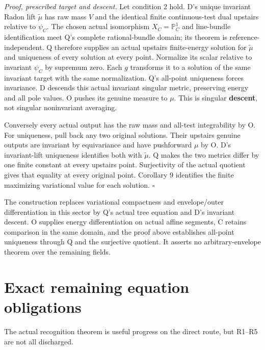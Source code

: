 \documentclass[
  11pt,
]{article}
\begin{document}
\emph{Proof, prescribed target and descent.} Let condition 2 hold. D's
unique invariant Radon lift \(\widetilde\mu\) has raw mass \(V\) and the
identical finite continuous-test dual upstairs relative to \(\psi_C\).
The chosen actual isomorphism \(X_C=\mathbb P^1_C\) and line-bundle
identification meet Q's complete rational-bundle domain; its theorem is
reference-independent. Q therefore supplies an actual upstairs
finite-energy solution for \(\widetilde\mu\) and uniqueness of every
solution at every point. Normalize its scalar relative to invariant
\(\psi_C\) by supremum zero. Each \(g\) transforms it to a solution of
the same invariant target with the same normalization. Q's all-point
uniqueness forces invariance. D descends this actual invariant singular
metric, preserving energy and all pole values. O pushes its genuine
measure to \(\mu\). This is singular \textbf{descent}, not singular
noninvariant averaging.

Conversely every actual output has the raw mass and all-test
integrability by O. For uniqueness, pull back any two original
solutions. Their upstairs genuine outputs are invariant by equivariance
and have pushforward \(\mu\) by O. D's invariant-lift uniqueness
identifies both with \(\widetilde\mu\). Q makes the two metrics differ
by one finite constant at every upstairs point. Surjectivity of the
actual quotient gives that equality at every original point. Corollary 9
identifies the finite maximizing variational value for each solution.
\(\square\)

The construction replaces variational compactness and envelope/outer
differentiation in this sector by Q's actual tree equation and D's
invariant descent. O supplies energy differentiation on actual affine
segments, C retains comparison in the same domain, and the proof above
establishes all-point uniqueness through Q and the surjective quotient.
It asserts no arbitrary-envelope theorem over the remaining fields.

\section{Exact remaining equation
obligations}\label{exact-remaining-equation-obligations}

The actual recognition theorem is useful progress on the direct route,
but R1--R5 are not all discharged.
\end{document}
